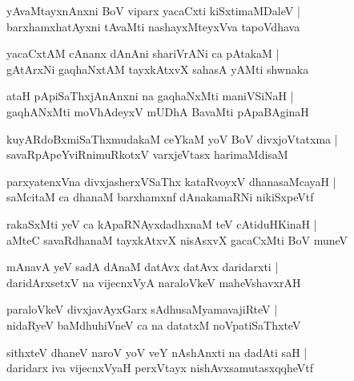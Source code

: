 \begin{shloka}
yAvaMtayxnAnxni BoV viparx yacaCxti kiSxtimaMDaleV |\\
barxhamxhatAyxni tAvaMti nashayxMteyxVva tapoVdhava
\end{shloka}

\begin{shloka}
yacaCxtAM cAnanx dAnAni shariVrANi ca pAtakaM |\\
gAtArxNi gaqhaNxtAM tayxkAtxvX sahasA yAMti shwnaka
\end{shloka}

\begin{shloka}
ataH pApiSaThxjAnAnxni na gaqhaNxMti maniVSiNaH |\\
gaqhANxMti moVhAdeyxV mUDhA BavaMti pApaBAginaH
\end{shloka}

\begin{shloka}
kuyARdoBxmiSaThxmudakaM ceYkaM yoV BoV divxjoVtatxma |\\
savaRpApeYviRnimuRkotxV varxjeVtasx harimaMdisaM
\end{shloka}

\begin{shloka}
parxyatenxVna divxjasherxVSaThx kataRvoyxV dhanasaMcayaH |\\
saMcitaM ca dhanaM barxhamxnf dAnakamaRNi nikiSxpeVtf
\end{shloka}

\begin{shloka}
rakaSxMti yeV ca kApaRNAyxdadhxnaM teV cAtiduHKinaH |\\
aMteC savaRdhanaM tayxkAtxvX nisAsxvX gacaCxMti BoV muneV 
\end{shloka}

\begin{shloka}
mAnavA yeV sadA dAnaM datAvx datAvx daridarxti |\\
daridArxsetxV na vijecnxVyA naraloVkeV maheVshavxrAH 
\end{shloka}

\begin{shloka}
paraloVkeV divxjavAyxGarx sAdhusaMyamavajiRteV |\\
nidaRyeV baMdhuhiVneV ca na datatxM noVpatiSaThxteV
\end{shloka}

\begin{shloka}
sithxteV dhaneV naroV yoV veY nAshAnxti na dadAti saH |\\
daridarx iva vijecnxVyaH perxVtayx nishAvxsamutasxqqheVtf
\end{shloka}

